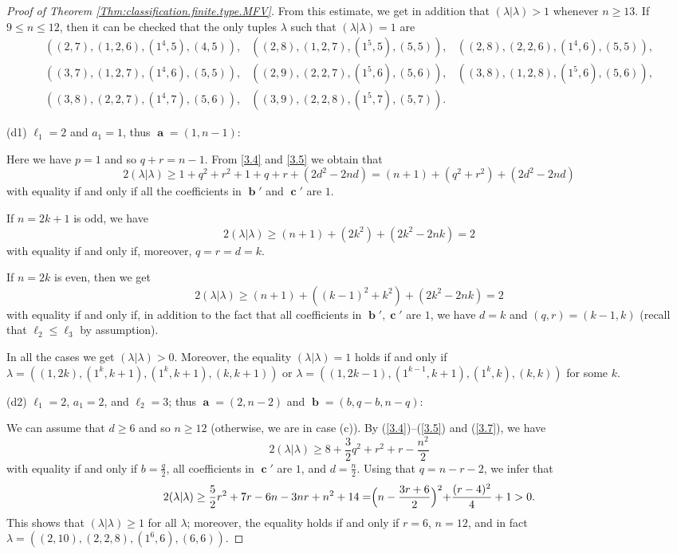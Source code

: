 \documentclass[12pt,reqno]{amsart}
\begin{document}
\begin{proof}[Proof  of Theorem \ref{Thm:classification.finite.type.MFV}]
From this estimate, we get in addition that $(\lambda|\lambda)>1$ whenever $n\geq 13$.
If $9\leq n\leq 12$, then it can be checked that the only tuples $\lambda$ such that $(\lambda|\lambda)=1$ are
$$
\begin{array}{lll}
((2,7),(1,2,6),(1^4,5),(4,5)), & ((2,8),(1,2,7),(1^5,5),(5,5)), & ((2,8),(2,2,6),(1^4,6),(5,5)),\\
((3,7),(1,2,7),(1^4,6),(5,5)), & ((2,9),(2,2,7),(1^5,6),(5,6)), & ((3,8),(1,2,8),(1^5,6),(5,6)),\\
((3,8),(2,2,7),(1^4,7),(5,6)), & ((3,9),(2,2,8),(1^5,7),(5,7)).
\end{array}
$$


\bigskip
\noindent
(d1) $\ell_1=2$ and $a_1=1$, thus $\mbfa=(1,n-1)$:

Here we have $p=1$ and so $q+r=n-1$. From \eqref{3.4} and \eqref{3.5} we obtain that
$$
2(\lambda|\lambda)\geq 1+q^2+r^2+1+q+r+(2d^2-2nd)=(n+1)+(q^2+r^2)+(2d^2-2nd)
$$
with equality if and only if all the coefficients in $\mbfb'$ and $\mbfc'$ are $1$.

If $n=2k+1$ is odd, we have
$$
2(\lambda|\lambda)\geq (n+1)+(2k^2)+(2k^2-2nk)=2
$$
with equality if and only if, moreover, $q=r=d=k$.

If $n=2k$ is even, then we get
$$
2(\lambda|\lambda)\geq (n+1)+((k-1)^2+k^2)+(2k^2-2nk)=2
$$
with equality if and only if, in addition to the fact that all coefficients in $\mbfb',\mbfc'$ are $1$, we have $d=k$ and $(q,r)=(k-1,k)$ (recall that $\ell_2\leq \ell_3$ by assumption).

In all the cases we get $(\lambda|\lambda)>0$. Moreover, the equality $(\lambda|\lambda)=1$ holds if and only if
$\lambda=((1,2k),(1^k,k+1),(1^k,k+1),(k,k+1))$ or
$\lambda=((1,2k-1),(1^{k-1},k+1),(1^k,k),(k,k))$ for some $k$.




\bigskip
\noindent
(d2) $\ell_1=2$, $a_1=2$, and $\ell_2=3$; thus $\mbfa=(2,n-2)$ and $\mbfb=(b,q-b,n-q)$:

We can assume that $d\geq 6$ and so $n\geq 12$
(otherwise, we are in case (c)).
By (\ref{3.4})--(\ref{3.5}) and (\ref{3.7}), we have
$$
2(\lambda|\lambda) \geq 8+\frac{3}{2}q^2+r^2+r-\frac{n^2}{2}
$$
with equality if and only if $b=\frac{q}{2}$, all coefficients in $\mbfc'$ are $1$, and $d=\frac{n}{2}$.
Using that $q=n-r-2$, we infer that
$$
2(\lambda|\lambda)\geq\frac{5}{2}r^2+7r-6n-3nr+n^2+14
= \Bigr( n-\frac{3r+6}{2} \Bigl)^2+\frac{(r-4)^2}{4}+1 > 0.
$$
This shows that $(\lambda|\lambda)\geq 1$ for all $\lambda$; moreover, the equality holds if and only if $r=6$, $n=12$, and in fact $\lambda=((2,10),(2,2,8),(1^6,6),(6,6))$.


\end{proof}
\end{document}
